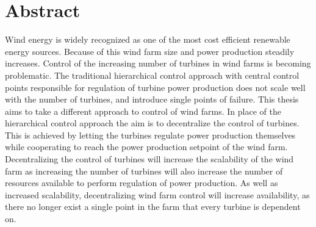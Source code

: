 
\chapter{Abstract}
Wind energy is widely recognized as one of the most cost efficient renewable energy sources. 
Because of this wind farm size and power production steadily increases.
Control of the increasing number of turbines in wind farms is becoming problematic.
%
The traditional hierarchical control approach with central control points responsible for regulation of turbine power production does not scale well with the number of turbines, and introduce single points of failure.
%
This thesis aims to take a different approach to control of wind farms.
%
In place of the hierarchical control approach the aim is to decentralize the control of turbines.
%
This is achieved by letting the turbines regulate power production themselves while cooperating to reach the power production setpoint of the wind farm.
Decentralizing the control of turbines will increase the scalability of the wind farm as increasing the number of turbines will also increase the number of resources available to perform regulation of power production.
%
As well as increased scalability, decentralizing wind farm control will increase availability, as there no longer exist a single point in the farm that every turbine is dependent on.

